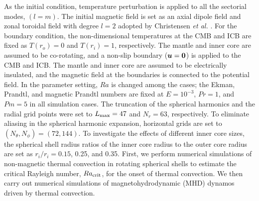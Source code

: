 As the initial condition, temperature perturbation is applied to all the sectorial modes, $(l = m)$. 
The initial magnetic field is set as an axial dipole field and zonal toroidal field with degree $l=2$ adopted by Christensen {\it et al.} . 
For the boundary condition, the non-dimensional temperatures at the CMB and ICB are fixed as $T(r_{o}) = 0$ and  $T(r_{i}) = 1$, respectively. 
The mantle and inner core are assumed to be co-rotating, and a non-slip boundary ($\mbox{\boldmath$u$} = \mbox{\boldmath$0$}$) is applied to the CMB and ICB. 
The mantle and inner core are assumed to be electrically insulated, and the magnetic field at the boundaries is connected to the potential field.
In the parameter setting, $Ra$ is changed among the cases; the Ekman, Prandtl, and magnetic Prandtl numbers are fixed at $E = 10^{-3}$, $Pr = 1$, and $Pm = 5$ in all simulation cases. 
The truncation of the spherical harmonics and the radial grid points were set to $L_{\rm max} = 47$ and $N_{r} = 63$, respectively. 
To eliminate aliasing in the spherical harmonic expansion, horizontal grids are set to $(N_{\theta}, N_{\phi}) = (72, 144)$.
To investigate the effects of different inner core sizes, the spherical shell radius ratios of the inner core radius to the outer core radius are set as $r_{i} / r_{i} = 0.15$, 0.25, and 0.35. 
First, we perform numerical simulations of non-magnetic thermal convection in rotating spherical shells to estimate the critical Rayleigh number, $Ra_{\rm crit}$, for the onset of thermal convection. 
We then carry out numerical simulations of magnetohydrodynamic (MHD) dynamos driven by thermal convection. 

